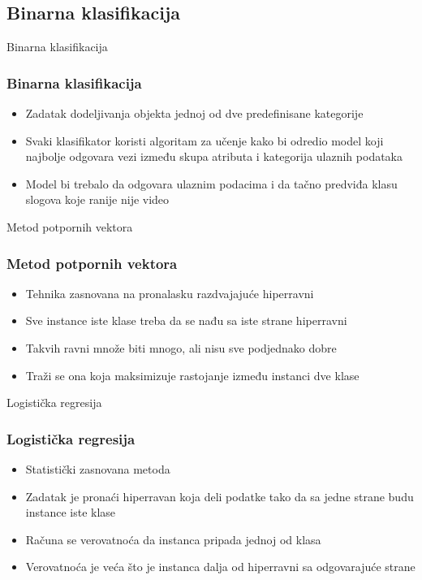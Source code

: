 \documentclass{beamer}
\begin{document}
\subsection{Binarna klasifikacija}
\begin{frame}{Binarna klasifikacija}
	\frametitle{Binarna klasifikacija}
	
	\begin{itemize}
		\item Zadatak dodeljivanja objekta jednoj od dve predefinisane kategorije
		
		\item Svaki klasifikator koristi algoritam za učenje kako bi odredio model koji najbolje odgovara vezi između skupa atributa i kategorija ulaznih podataka
		
		\item Model bi trebalo da odgovara ulaznim podacima i da tačno predviđa klasu slogova koje ranije nije video
	\end{itemize}
	
\end{frame}

\begin{frame}{Metod potpornih vektora}
	\frametitle{Metod potpornih vektora}
	
	\begin{itemize}
		\item Tehnika zasnovana na pronalasku razdvajajuće hiperravni
		\item Sve instance iste klase treba da se nađu sa iste strane hiperravni
		
		\item Takvih ravni množe biti mnogo, ali nisu sve podjednako dobre
		\item Traži se ona koja maksimizuje rastojanje između instanci dve klase
	\end{itemize}
\end{frame}

\begin{frame}{Logistička regresija}
	\frametitle{Logistička regresija}
	
	\begin{itemize}
		\item Statistički zasnovana metoda
		\item Zadatak je pronaći hiperravan koja deli podatke tako da sa jedne strane budu instance iste klase
		\item Računa se verovatnoća da instanca pripada jednoj od klasa 
		\item Verovatnoća je veća što je instanca dalja od hiperravni sa odgovarajuće strane
	\end{itemize}
\end{frame}
\end{document}
